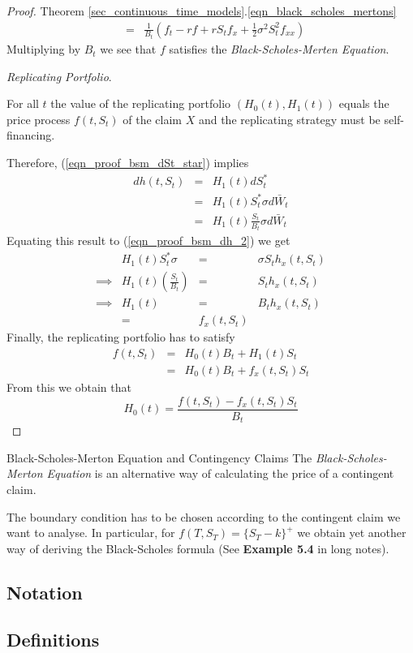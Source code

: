 \documentclass[11pt,a4paper]{article}
\begin{document}
\begin{proof}{Theorem \ref{sec_continuous_time_models}.\ref{eqn_black_scholes_mertons}}
\[\begin{array}{rcl}
      &=&\frac1{B_t}\left(f_t-rf+rS_tf_x+\frac12\sigma^2S_t^2f_{xx}\right)
    \end{array}\]
    Multiplying by $B_t$ we see that $f$ satisfies the \textit{Black-Scholes-Merten Equation}.\proved
    \par \textit{Replicating Portfolio}.
    \par For all $t$ the value of the replicating portfolio $\left(H_0(t),H_1(t)\right)$ equals the price process $f(t,S_t)$ of the claim $X$ and the replicating strategy must be self-financing.
    \par Therefore, (\ref{eqn_proof_bsm_dSt_star}) implies
    \[\begin{array}{rcl}
      dh(t,S_t)&=&H_1(t)dS_t^*\\
      &=&H_1(t)S_t^*\sigma d\bar{W}_t\\
      &=&H_1(t)\frac{S_t}{B_t}\sigma d\bar{W}_t
    \end{array}\]
    Equating this result to (\ref{eqn_proof_bsm_dh_2}) we get
    \[\begin{array}{rrcl}
      &H_1(t)S_t^*\sigma&=&\sigma S_th_x(t,S_t)\\
      \implies&H_1(t)\left(\frac{S_t}{B_t}\right)&=&S_th_x(t,S_t)\\
      \implies&H_1(t)&=&B_th_x(t,S_t)\\
      &=&f_x(t,S_t)
    \end{array}\]
    Finally, the replicating portfolio has to satisfy
    \[\begin{array}{rcl}
      f(t,S_t)&=&H_0(t)B_t+H_1(t)S_t\\
      &=&H_0(t)B_t+f_x(t,S_t)S_t
    \end{array}\]
    From this we obtain that
    \[ H_0(t)=\frac{f(t,S_t)-f_x(t,S_t)S_t}{B_t} \]
  \end{proof}

  \begin{remark}{Black-Scholes-Merton Equation and Contingency Claims}
    The \textit{Black-Scholes-Merton Equation} is an alternative way of calculating the price of a contingent claim.
    \par The boundary condition has to be chosen according to the contingent claim we want to analyse. In particular, for $f(T,S_T)=\{S_T-k\}^+$ we obtain yet another way of deriving the Black-Scholes formula (See \textbf{Example 5.4} in long notes).
  \end{remark}


\subsection{Notation}

\subsection{Definitions}
\end{document}
